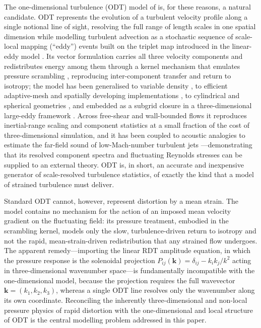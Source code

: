 \documentclass[lineno]{JFM-FLM_Au}
\begin{document}
The one-dimensional turbulence (ODT) model of \citet{Kerstein1999} is, for
these reasons, a natural candidate. ODT represents the evolution of a turbulent
velocity profile along a single notional line of sight, resolving the full range
of length scales in one spatial dimension while modelling turbulent advection as
a stochastic sequence of scale-local mapping (``eddy'') events built on the
triplet map introduced in the linear-eddy model \citep{Kerstein1991}. Its vector
formulation \citep{Kerstein2001} carries all three velocity components and
redistributes energy among them through a kernel mechanism that emulates
pressure scrambling \citep{WunschKerstein2001,Kerstein2001}, reproducing
inter-component transfer and return to isotropy; the model has been generalised
to variable density \citep{AshurstKerstein2005}, to efficient adaptive-mesh and
spatially developing implementations \citep{Lignell2013,StephensLignell2021}, to
cylindrical and spherical geometries \citep{Lignell2018}, and embedded as a
subgrid closure in a three-dimensional large-eddy framework
\citep{SchmidtKerstein2010}. Across free-shear and wall-bounded flows it
reproduces inertial-range scaling and component statistics at a small fraction
of the cost of three-dimensional simulation, and it has been coupled to acoustic
analogies to estimate the far-field sound of low-Mach-number turbulent jets
\citep{SharmaKleinSchmidt2022,MedinaMendez2023}---demonstrating that its
resolved component spectra and fluctuating Reynolds stresses can be supplied to
an external theory. ODT is, in short, an accurate and inexpensive generator of
scale-resolved turbulence statistics, of exactly the kind that a model of
strained turbulence must deliver.

Standard ODT cannot, however, represent distortion by a mean strain. The model
contains no mechanism for the action of an imposed mean velocity gradient on the
fluctuating field: its pressure treatment, embodied in the scrambling kernel,
models only the slow, turbulence-driven return to isotropy and not the rapid,
mean-strain-driven redistribution that any strained flow undergoes. The apparent
remedy---importing the linear RDT amplitude equation, in which the pressure
response is the solenoidal projection $P_{ij}(\boldsymbol{k}) = \delta_{ij} - k_i
k_j/k^2$ acting in three-dimensional wavenumber space---is fundamentally
incompatible with the one-dimensional model, because the projection requires the
full wavevector $\boldsymbol{k}=(k_1,k_2,k_3)$, whereas a single ODT line
resolves only the wavenumber along its own coordinate. Reconciling the
inherently three-dimensional and non-local pressure physics of rapid distortion
with the one-dimensional and local structure of ODT is the central modelling
problem addressed in this paper.
\end{document}
